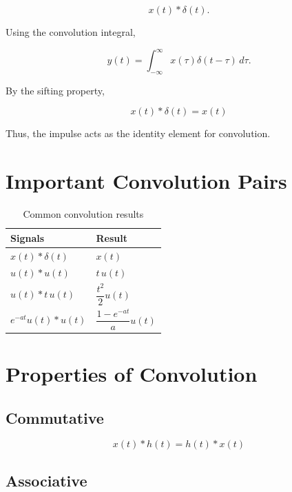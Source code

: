 \[
x(t)*\delta(t).
\]

Using the convolution integral,

\[
y(t)=
\int_{-\infty}^{\infty}
x(\tau)\delta(t-\tau)\,d\tau.
\]

By the sifting property,

\[
\boxed{
x(t)*\delta(t)=x(t)
}
\]

Thus, the impulse acts as the identity element for convolution.


\section{Important Convolution Pairs}

\begin{table}[H]
\centering
\caption{Common convolution results}
\begin{tabular}{|p{5cm}|p{5cm}|}
\hline
\textbf{Signals} & \textbf{Result} \\
\hline
\(x(t)*\delta(t)\) & \(x(t)\) \\
\hline
\(u(t)*u(t)\) & \(t\,u(t)\) \\
\hline
\(u(t)*t\,u(t)\) & \(\dfrac{t^2}{2}u(t)\) \\
\hline
\(e^{-at}u(t)*u(t)\) & \(\dfrac{1-e^{-at}}{a}u(t)\) \\
\hline
\end{tabular}
\end{table}


\section{Properties of Convolution}


\subsection{Commutative}

\[
\boxed{
x(t)*h(t)=h(t)*x(t)
}
\]


\subsection{Associative}


